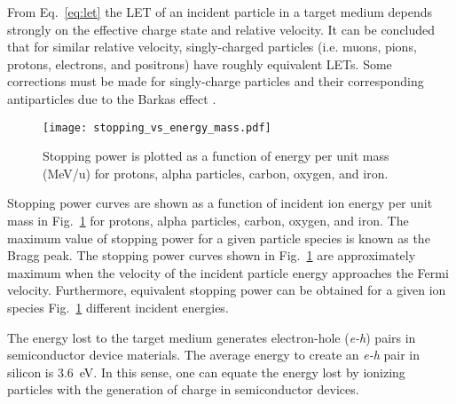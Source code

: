From Eq.~\ref{eq:let} the LET of an incident particle in a target medium depends strongly on the effective charge state and relative velocity.
It can be concluded that for similar relative velocity, singly-charged particles (i.e. muons, pions, protons, electrons, and positrons) have roughly equivalent LETs.
Some corrections must be made for singly-charge particles and their corresponding antiparticles due to the Barkas effect \cite{bichsel2010passage}.
\begin{figure}[htbp]
    \begin{center}
        \texttt{[image: stopping\_vs\_energy\_mass.pdf]}
    \end{center}
    \caption{Stopping power is plotted as a function of energy per unit mass (MeV/u) for protons, alpha particles, carbon, oxygen, and iron.}
    \label{fig:stopping-power-vs-energy-per-mass}
\end{figure}
Stopping power curves are shown as a function of incident ion energy per unit mass in Fig.~\ref{fig:stopping-power-vs-energy-per-mass} for protons, alpha particles, carbon, oxygen, and iron.
The maximum value of stopping power for a given particle species is known as the Bragg peak.
The stopping power curves shown in Fig.~\ref{fig:stopping-power-vs-energy-per-mass} are approximately maximum when the velocity of the incident particle energy approaches the Fermi velocity.
Furthermore, equivalent stopping power can be obtained for a given ion species Fig.~\ref{fig:stopping-power-vs-energy-per-mass} different incident energies.

The energy lost to the target medium generates electron-hole (\emph{e-h}) pairs in semiconductor device materials. 
The average energy to create an \emph{e-h} pair in silicon is 3.6~eV.
In this sense, one can equate the energy lost by ionizing particles with the generation of charge in semiconductor devices.

